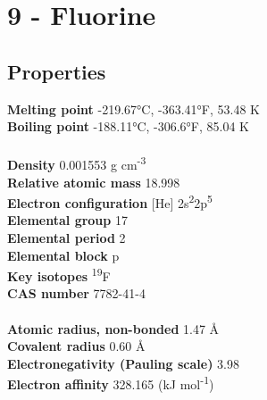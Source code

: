 \section{9 - Fluorine}
\label{sec:elem-fluorine}
\subsection{Properties}
\textbf{Melting point} -219.67°C, -363.41°F, 53.48 K\\
\textbf{Boiling point} -188.11°C, -306.6°F, 85.04 K\\
\\
\textbf{Density} 0.001553 g cm\textsuperscript{-3}\\
\textbf{Relative atomic mass} 18.998\\
\textbf{Electron configuration} [He] 2s\textsuperscript{2}2p\textsuperscript{5}\\
\textbf{Elemental group} 17\\
\textbf{Elemental period} 2\\
\textbf{Elemental block} p\\
\textbf{Key isotopes} \textsuperscript{19}F\\
\textbf{CAS number} 7782-41-4\\
\\
\textbf{Atomic radius, non-bonded} 1.47 Å\\
\textbf{Covalent radius} 0.60 Å\\
\textbf{Electronegativity (Pauling scale)} 3.98\\
\textbf{Electron affinity} 328.165 (kJ mol\textsuperscript{-1})\\